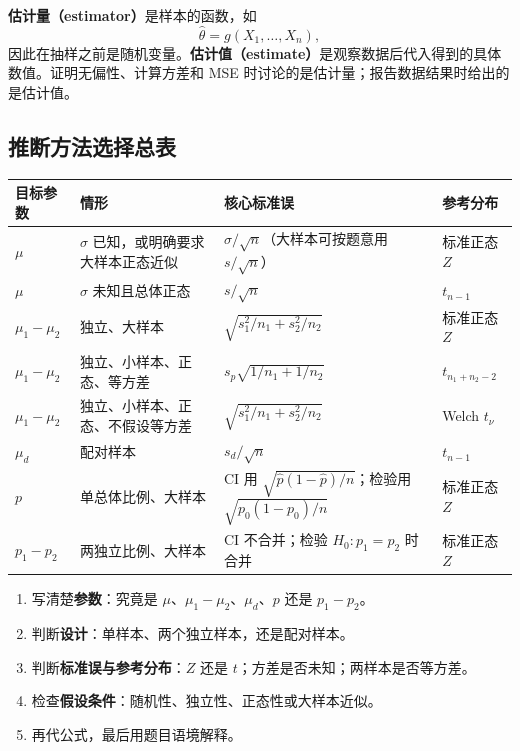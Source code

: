 \documentclass[11pt,a4paper]{article}
\newcommand{\1}{\mathbf{1}}
\begin{document}
\begin{conceptbox}
\textbf{估计量（estimator）}是样本的函数，如
\[
  \hat\theta=g(X_1,\ldots,X_n),
\]
因此在抽样之前是随机变量。\textbf{估计值（estimate）}是观察数据后代入得到的具体数值。证明无偏性、计算方差和 MSE 时讨论的是估计量；报告数据结果时给出的是估计值。
\end{conceptbox}

\subsection{推断方法选择总表}

\begin{center}
\renewcommand{\arraystretch}{1.25}
\begin{tabularx}{\textwidth}{p{2.4cm}p{3.5cm}p{3.6cm}X}
\toprule
目标参数 & 情形 & 核心标准误 & 参考分布\\
\midrule
$\mu$ & $\sigma$ 已知，或明确要求大样本正态近似
& $\sigma/\sqrt n$（大样本可按题意用 $s/\sqrt n$）
& 标准正态 $Z$\\
$\mu$ & $\sigma$ 未知且总体正态
& $s/\sqrt n$
& $t_{n-1}$\\
$\mu_1-\mu_2$ & 独立、大样本
& $\sqrt{s_1^2/n_1+s_2^2/n_2}$
& 标准正态 $Z$\\
$\mu_1-\mu_2$ & 独立、小样本、正态、等方差
& $s_p\sqrt{1/n_1+1/n_2}$
& $t_{n_1+n_2-2}$\\
$\mu_1-\mu_2$ & 独立、小样本、正态、不假设等方差
& $\sqrt{s_1^2/n_1+s_2^2/n_2}$
& Welch $t_\nu$\\
$\mu_d$ & 配对样本
& $s_d/\sqrt n$
& $t_{n-1}$\\
$p$ & 单总体比例、大样本
& CI 用 $\sqrt{\hat p(1-\hat p)/n}$；检验用 $\sqrt{p_0(1-p_0)/n}$
& 标准正态 $Z$\\
$p_1-p_2$ & 两独立比例、大样本
& CI 不合并；检验 $H_0:p_1=p_2$ 时合并
& 标准正态 $Z$\\
\bottomrule
\end{tabularx}
\end{center}

\begin{methodbox}[任何 CI / 检验题的第一分钟]
\begin{enumerate}
  \item 写清楚\textbf{参数}：究竟是 $\mu$、$\mu_1-\mu_2$、$\mu_d$、$p$ 还是 $p_1-p_2$。
  \item 判断\textbf{设计}：单样本、两个独立样本，还是配对样本。
  \item 判断\textbf{标准误与参考分布}：$Z$ 还是 $t$；方差是否未知；两样本是否等方差。
  \item 检查\textbf{假设条件}：随机性、独立性、正态性或大样本近似。
  \item 再代公式，最后用题目语境解释。
\end{enumerate}
\end{methodbox}
\end{document}
